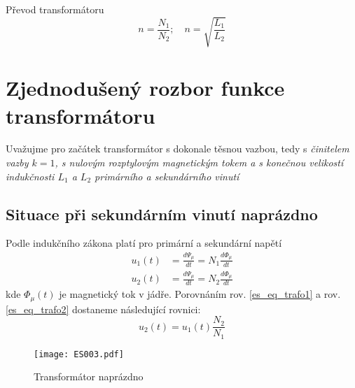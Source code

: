 {    Převod transformátoru
    \begin{equation}\label{es:eq_turn_ratio}
        n = \frac{N_1}{N_2}; \quad n=\sqrt{\frac{L_1}{L_2}}
    \end{equation}
    
  \section{Zjednodušený rozbor funkce transformátoru}\label{ES:kap_simple_rozbor_trafa}
    Uvažujme pro začátek transformátor s dokonale těsnou vazbou, tedy s \emph{činitelem vazby
    $k=1$, s nulovým rozptylovým magnetickým tokem a s konečnou velikostí indukčnosti $L_1$ a $L_2$
    primárního a sekundárního vinutí}

    \subsection{Situace při sekundárním vinutí naprázdno}\label{ES:kap_rozbor_trafa}
      Podle indukčního zákona platí pro primární a sekundární napětí
      \begin{subequations}\label{ES:eq_015}
        \begin{align}
          u_1(t)&=\frac{d\Psi_\mu}{dt} 
                 = N_1\frac{d\Phi_\mu}{dt}\label{es_eq_trafo1} \\
          u_2(t)&=\frac{d\Psi_\mu}{dt} 
                 = N_2\frac{d\Phi_\mu}{dt}\label{es_eq_trafo2}  
        \end{align}
      \end{subequations}      
      kde $\Phi_\mu(t)$ je magnetický tok v jádře. Porovnáním rov. \ref{es_eq_trafo1} a rov. 
      \ref{es_eq_trafo2} dostaneme následující rovnici:
      \begin{equation}\label{es_int_uprim_trafo}
          u_2(t)=u_1(t)\frac{N_2}{N_1}
      \end{equation}

      \begin{figure}[ht!]   %
        \centering
        \texttt{[image: ES003.pdf]}
        \caption{Transformátor naprázdno}
        \label{ENZ:fig_003}
      \end{figure}
      
}
